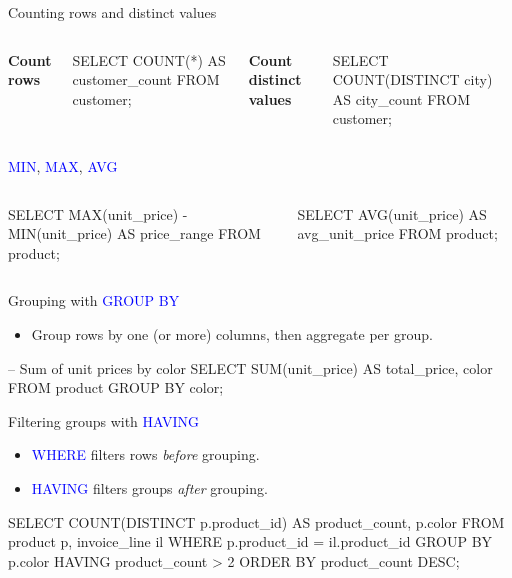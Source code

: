 \documentclass[10pt,aspectratio=169]{beamer}
\newcommand{\sqlk}[1]{\textcolor{blue}{#1}}
\begin{document}
\begin{frame}[fragile]{Counting rows and distinct values}
\begin{columns}[T,onlytextwidth]
\textbf{Count rows}
\begin{codesql}
SELECT COUNT(*) AS customer_count
FROM   customer;
\end{codesql}
\textbf{Count distinct values}
\begin{codesql}
SELECT COUNT(DISTINCT city) AS city_count
FROM   customer;
\end{codesql}
\end{columns}
\end{frame}

\begin{frame}[fragile]{\sqlk{MIN}, \sqlk{MAX}, \sqlk{AVG}}
\begin{columns}[T,onlytextwidth]
\begin{codesql}
SELECT MAX(unit_price) - MIN(unit_price) AS price_range
FROM   product;
\end{codesql}
\begin{codesql}
SELECT AVG(unit_price) AS avg_unit_price
FROM   product;
\end{codesql}
\end{columns}
\end{frame}

\begin{frame}[fragile]{Grouping with \sqlk{GROUP BY}}
\begin{itemize}
  \item Group rows by one (or more) columns, then aggregate per group.
\end{itemize}
\vspace{0.6em}
\begin{codesql}
-- Sum of unit prices by color
SELECT SUM(unit_price) AS total_price, color
FROM   product
GROUP BY color;
\end{codesql}
\end{frame}

\begin{frame}[fragile]{Filtering groups with \sqlk{HAVING}}
\begin{itemize}
  \item \sqlk{WHERE} filters rows \emph{before} grouping.
  \item \sqlk{HAVING} filters groups \emph{after} grouping.
\end{itemize}
\vspace{0.6em}
\begin{codesql}
SELECT COUNT(DISTINCT p.product_id) AS product_count, p.color
FROM   product p, invoice_line il
WHERE  p.product_id = il.product_id
GROUP BY p.color
HAVING product_count > 2
ORDER BY product_count DESC;
\end{codesql}
\end{frame}
\end{document}
